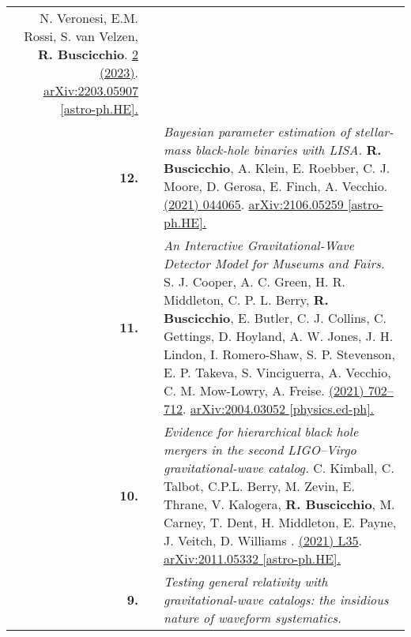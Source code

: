 {\begin{longtable}{rp{0.3cm}p{15.8cm}}
\newline{}
N. Veronesi, E.M. Rossi, S. van Velzen, \textbf{R. Buscicchio}.
\newline{}
\href{https://academic.oup.com/mnras/article/514/2/2092/6587069}{\mnras 514 2 (2023)}. \href{https://arxiv.org/abs/2203.05907}{arXiv:2203.05907 [astro-ph.HE].}
\vspace{0.09cm}\\
%
\textbf{12.} & & \textit{Bayesian parameter estimation of stellar-mass black-hole binaries with LISA.}
\newline{}
\textbf{R. Buscicchio}, A. Klein, E. Roebber, C. J. Moore, D. Gerosa, E. Finch, A. Vecchio.
\newline{}
\href{https://journals.aps.org/prd/abstract/10.1103/PhysRevD.104.044065}{\prd 104 (2021) 044065}. \href{https://arxiv.org/abs/2106.05259}{arXiv:2106.05259 [astro-ph.HE].}
\vspace{0.09cm}\\
%
\textbf{11.} & & \textit{An Interactive Gravitational-Wave Detector Model for Museums and Fairs.}
\newline{}
S. J. Cooper, A. C. Green, H. R. Middleton, C. P. L. Berry, \textbf{R. Buscicchio}, E. Butler, C. J. Collins, C. Gettings, D. Hoyland, A. W. Jones, J. H. Lindon, I. Romero-Shaw, S. P. Stevenson, E. P. Takeva, S. Vinciguerra, A. Vecchio, C. M. Mow-Lowry, A. Freise.
\newline{}
\href{https://pubs.aip.org/aapt/ajp/article/89/7/702/1056907/An-interactive-gravitational-wave-detector-model}{\ajp 89 (2021) 702–712}. \href{https://arxiv.org/abs/2004.03052}{arXiv:2004.03052 [physics.ed-ph].}
\vspace{0.09cm}\\
%
\textbf{10.} & & \textit{Evidence for hierarchical black hole mergers in the second LIGO--Virgo gravitational-wave catalog.}
\newline{}
C. Kimball, C. Talbot, C.P.L. Berry, M. Zevin, E. Thrane, V. Kalogera, \textbf{R. Buscicchio}, M. Carney, T. Dent, H. Middleton, E. Payne, J. Veitch, D. Williams .
\newline{}
\href{https://iopscience.iop.org/article/10.3847/2041-8213/ac0aef}{\apjl 915 (2021) L35}. \href{https://arxiv.org/abs/2011.05332}{arXiv:2011.05332 [astro-ph.HE].}
\vspace{0.09cm}\\
%
\textbf{9.} & & \textit{Testing general relativity with gravitational-wave catalogs: the insidious nature of waveform systematics.}
\newline{}

\end{longtable}}
